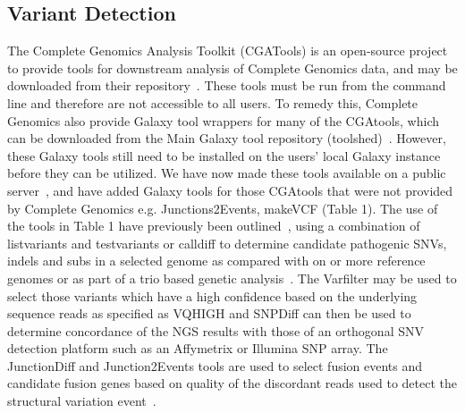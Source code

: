 \documentclass[10pt]{bmc_article}
\newenvironment{bmcformat}{\begin{raggedright}\baselineskip20pt\sloppy\setboolean{publ}{false}}{\end{raggedright}\baselineskip20pt\sloppy}
\begin{document}
\begin{bmcformat}
\subsection*{Variant Detection}
The Complete Genomics Analysis Toolkit (CGATools) is an open-source project to provide tools for downstream analysis of Complete Genomics data, and may be downloaded from their repository~\cite{url-cgatools}. These tools must be run from the command line and therefore are not accessible to all users. To remedy this, Complete Genomics also provide Galaxy tool wrappers for many of the CGAtools, which can be downloaded from the Main Galaxy tool repository (toolshed)~\cite{url-toolshed}. However, these Galaxy tools still need to be installed on the users’ local Galaxy instance before they can be utilized. We have now made these tools available on a public server~\cite{url-nbicgalaxy}, and have added Galaxy tools for those CGAtools that were not provided by Complete Genomics e.g. Junctions2Events, makeVCF (Table 1).  The use of the tools in Table 1 have previously been outlined~\cite{nieminen}, using a combination of listvariants and testvariants or calldiff to determine candidate pathogenic SNVs, indels and subs in a selected genome as compared with on or more reference genomes or as part of a trio based genetic analysis~\cite{nieminen}.  The Varfilter may be used to select those variants which have a high confidence based on the underlying sequence reads as specified as VQHIGH and SNPDiff can then be used to determine concordance of the NGS results with those of an orthogonal SNV detection platform such as an Affymetrix or Illumina SNP array.  The JunctionDiff and Junction2Events tools are used to select fusion events and candidate fusion genes based on quality of the discordant reads used to detect the structural variation event~\cite{ifuse}.


\end{bmcformat}
\end{document}
